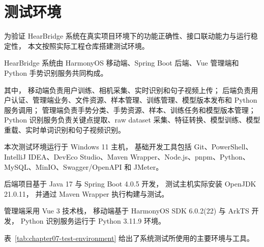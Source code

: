 
\section{测试环境}

为验证 HearBridge 系统在真实项目环境下的功能正确性、接口联动能力与运行稳定性，
本文按照实际工程仓库搭建测试环境。

HearBridge 系统由 HarmonyOS 移动端、Spring Boot 后端、Vue 管理端和 Python 手势识别服务共同构成。

其中，
移动端负责用户训练、相机采集、实时识别和句子视频上传；
后端负责用户认证、管理端业务、文件资源、样本管理、训练管理、模型版本发布和 Python 服务调用；
管理端负责手势分类、手势资源、样本、训练任务和模型版本管理；
Python 识别服务负责关键点提取、raw dataset 采集、特征转换、模型训练、模型重载、实时单词识别和句子视频识别。

本次测试环境运行于 Windows 11 主机，
基础开发工具包括 Git、PowerShell、IntelliJ IDEA、DevEco Studio、Maven Wrapper、Node.js、pnpm、Python、MySQL、MinIO、Swagger/OpenAPI 和 JMeter。

后端项目基于 Java 17 与 Spring Boot 4.0.5 开发，
测试主机实际安装 OpenJDK 21.0.11，
并通过 Maven Wrapper 执行构建与测试。

管理端采用 Vue 3 技术栈，
移动端基于 HarmonyOS SDK 6.0.2(22) 与 ArkTS 开发，
Python 识别服务运行于 Python 3.11.9 环境。

表~\ref{tab:chapter07-test-environment} 给出了系统测试所使用的主要环境与工具。

